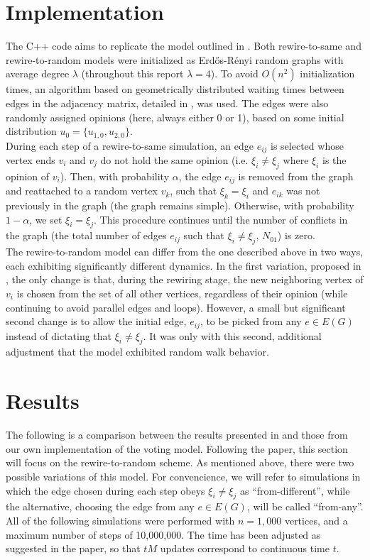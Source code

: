 \documentclass[11pt]{article}
\begin{document}
\section*{Implementation}
The C++ code aims to replicate the model outlined in \cite{durret:pnas12}. Both rewire-to-same and rewire-to-random models were initialized as Erd\H{o}s-R\'{e}nyi random graphs with average degree $\lambda$ (throughout this report $\lambda = 4$). To avoid $O(n^{2})$ initialization times, an algorithm based on geometrically distributed waiting times between edges in the adjacency matrix, detailed in \cite{batagelj:pre05}, was used. The edges were also randomly assigned opinions (here, always either 0 or 1), based on some initial distribution $u_{0}=\{u_{1,0},u_{2,0}\}$. \\[1pt]
\indent During each step of a rewire-to-same simulation, an edge $e_{ij}$ is selected whose vertex ends $v_{i}$ and $v_{j}$ do not hold the same opinion (i.e. $\xi_{i}\neq\xi_{j}$ where $\xi_{i}$ is the opinion of $v_{i}$). Then, with probability $\alpha$, the edge $e_{ij}$ is removed from the graph and reattached to a random vertex $v_{k}$, such that $\xi_{k}=\xi_{i}$ and $e_{ik}$ was not previously in the graph (the graph remains simple). Otherwise, with probability $1-\alpha$, we set $\xi_{i}=\xi_{j}$. This procedure continues until the number of conflicts in the graph (the total number of edges $e_{ij}$ such that $\xi_{i}\neq\xi_{j}$, $N_{01}$) is zero. \\[1pt]
\indent The rewire-to-random model can differ from the one described above in two ways, each exhibiting significantly different dynamics. In the first variation, proposed in \cite{durret:pnas12}, the only change is that, during the rewiring stage, the new neighboring vertex of $v_{i}$ is chosen from the set of all other vertices, regardless of their opinion (while continuing to avoid parallel edges and loops). However, a small but significant second change is to allow the initial edge, $e_{ij}$, to be picked from any $e\in E(G)$ instead of dictating that $\xi_{i}\neq\xi_{j}$.  It was only with this second, additional adjustment that the model exhibited random walk behavior.
\section*{Results}

The following is a comparison between the results presented in \cite{durret:pnas12} and those from our own implementation of the voting model. Following the paper, this section will focus on the rewire-to-random scheme. As mentioned above, there were two possible variations of this model. For convencience, we will refer to simulations in which the edge chosen during each step obeys $\xi_{i}\neq\xi_{j}$ as ``from-different'', while the alternative, choosing the edge from any $e\in E(G)$, will be called ``from-any''. All of the following simulations were performed with $n=1,000$ vertices, and a maximum number of steps of 10,000,000. The time has been adjusted as suggested in the paper, so that $tM$ updates correspond to continuous time $t$.\\
\end{document}
